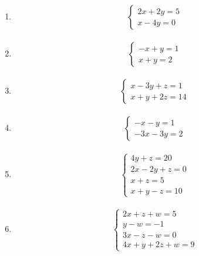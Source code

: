 \documentclass[11pt,a4paper]{report}
\begin{document}
\begin{multicols}{3}
\begin{enumerate}[label=\alph*)]
  \item 
  \begin{align*}
    \begin{cases}
      2x + 2y = 5 \\
      x - 4y = 0
    \end{cases}
  \end{align*}

  \item 
  \begin{align*}
    \begin{cases}
      -x + y = 1 \\
      x + y = 2
    \end{cases}
  \end{align*}

  \item 
  \begin{align*}
    \begin{cases}
      x - 3y + z = 1 \\
      x + y + 2z = 14
    \end{cases}
  \end{align*}

  \item 
  \begin{align*}
    \begin{cases}
      -x - y = 1 \\
      -3x - 3y = 2
    \end{cases}
  \end{align*}

  \item 
  \begin{align*}
    \begin{cases}
      4y + z = 20 \\
      2x - 2y + z = 0 \\
      x + z = 5 \\
      x + y - z = 10
    \end{cases}
  \end{align*}

  \item 
  \begin{align*}
    \begin{cases}
      2x + z + w = 5 \\
      y - w = -1 \\
      3x - z - w = 0 \\
      4x + y + 2z + w = 9
    \end{cases}
  \end{align*}
\end{enumerate}
\end{multicols}
\end{document}
